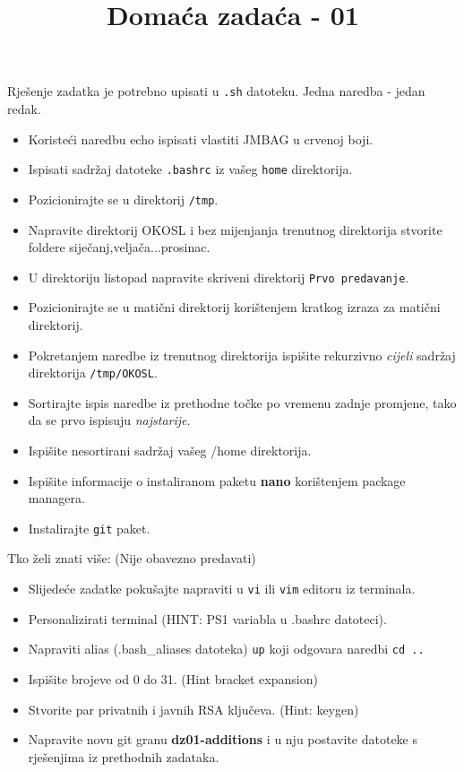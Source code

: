 \documentclass[12pt,a4paper]{article}
\newcommand{\shell}[1]{\texttt{#1}}
\begin{document}
  \title{Domaća zadaća - 01}
  \maketitle
  Rješenje zadatka je potrebno upisati u \shell{.sh} datoteku. Jedna naredba - jedan redak.
  \begin{itemize}
    \item Koristeći naredbu echo ispisati vlastiti JMBAG u crvenoj boji.
    \item Ispisati sadržaj datoteke \shell{.bashrc} iz vašeg \shell{home} direktorija.
    \item Pozicionirajte se u direktorij \shell{/tmp}.
    \item Napravite direktorij OKOSL i bez mijenjanja trenutnog direktorija stvorite foldere siječanj,veljača...prosinac.
    \item U direktoriju listopad napravite skriveni direktorij \shell{Prvo predavanje}.
    \item Pozicionirajte se u matični direktorij korištenjem kratkog izraza za matični direktorij.
    \item Pokretanjem naredbe iz trenutnog direktorija ispišite rekurzivno \textit{cijeli} sadržaj direktorija \shell{/tmp/OKOSL}.
    \item Sortirajte ispis naredbe iz prethodne točke po vremenu zadnje promjene, tako da se prvo ispisuju \textit{najstarije}.
    \item Ispišite nesortirani sadržaj vašeg /home direktorija.
    \item Ispišite informacije o instaliranom paketu \textbf{nano} korištenjem package managera.
    \item Instalirajte \shell{git} paket.
  \end{itemize}
  Tko želi znati više: (Nije obavezno predavati)
  \begin{itemize}
    \item Slijedeće zadatke pokušajte napraviti u \shell{vi} ili \shell{vim} editoru iz terminala.
    \item Personalizirati terminal (HINT: PS1 variabla u .bashrc datoteci).
    \item Napraviti alias (.bash\_aliases datoteka) \shell{up} koji odgovara naredbi \shell{cd ..}
    \item Ispišite brojeve od 0 do 31. (Hint bracket expansion)
    \item Stvorite par privatnih i javnih RSA ključeva. (Hint: keygen)
    \item Napravite novu git granu \textbf{dz01-additions} i u nju postavite datoteke s rješenjima iz prethodnih zadataka. 
  \end{itemize}
\end{document}
